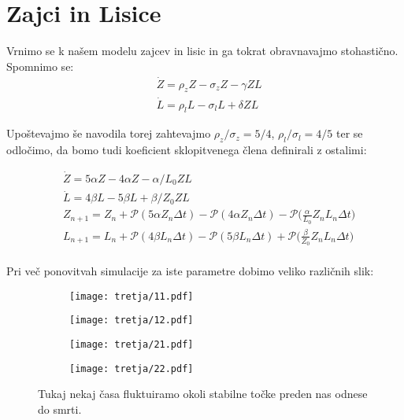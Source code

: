 \documentclass{article}
\begin{document}
\section{Zajci in Lisice}

Vrnimo se k našem modelu zajcev in lisic in ga tokrat obravnavajmo stohastično. Spomnimo se:
\begin{align*}
&\dot{Z} = \rho_z Z - \sigma_z Z - \gamma Z L \\
&\dot{L} = \rho_l L - \sigma_l L + \delta Z L
\end{align*}

Upoštevajmo še navodila torej zahtevajmo $\rho_z / \sigma_z = 5/4$, $\rho_l / \sigma_l = 4/5$ ter se odločimo, da bomo tudi koeficient sklopitvenega člena definirali z ostalimi:

\begin{align*}
&\dot{Z} = 5 \alpha Z - 4 \alpha Z - \alpha / L_0 Z L \\
&\dot{L} = 4 \beta L - 5 \beta L + \beta / Z_0 Z L \\
&Z_{n+1} = Z_n + \mathscr{P}(5 \alpha Z_n \Delta t) - \mathscr{P}(4 \alpha Z_n \Delta t) - \mathscr{P}\Big( \frac{\alpha}{L_0} Z_n L_n \Delta t\Big) \\
&L_{n+1} = L_n + \mathscr{P}(4 \beta L_n \Delta t) - \mathscr{P}(5 \beta L_n \Delta t) + \mathscr{P}\Big( \frac{\beta}{Z_0} Z_n L_n \Delta t\Big) \\
\end{align*}

Pri več ponovitvah simulacije za iste parametre dobimo veliko različnih slik:

\begin{figure}[H]
\centering
\begin{subfigure}{.49\textwidth}
\texttt{[image: tretja/11.pdf]}
\end{subfigure}
\begin{subfigure}{.49\textwidth}
\texttt{[image: tretja/12.pdf]}
\end{subfigure}
\caption*{}
\end{figure}

\begin{figure}[H]
\centering
\begin{subfigure}{.49\textwidth}
\texttt{[image: tretja/21.pdf]}
\end{subfigure}
\begin{subfigure}{.49\textwidth}
\texttt{[image: tretja/22.pdf]}
\end{subfigure}
\caption*{Tukaj nekaj časa fluktuiramo okoli stabilne točke preden nas odnese do smrti.}
\end{figure}
\end{document}
